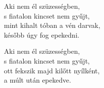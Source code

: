 \newpage
\begin{dhpverse}

 Aki nem él szüzességben,\\
s fiatalon kincset nem gyűjt,\\
mint kihalt tóban a vén darvak,\\
később úgy fog epekedni.

 Aki nem él szüzességben,\\
s fiatalon kincset nem gyűjt,\\
ott fekszik majd kilőtt nyílként,\\
a múlt után epekedve.

\end{dhpverse}

